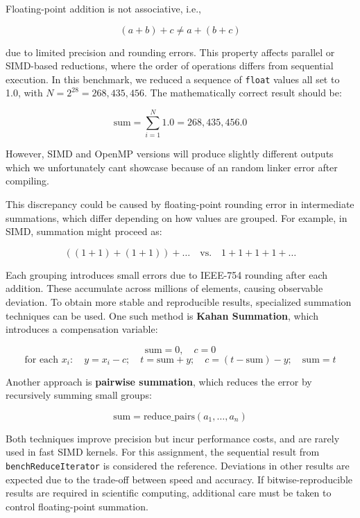 Floating-point addition is not associative, i.e.,

\[
    (a + b) + c \neq a + (b + c)
\]

due to limited precision and rounding errors.
This property affects parallel or SIMD-based reductions, where the order of operations differs from sequential execution.
In this benchmark, we reduced a sequence of \texttt{float} values all set to 1.0, with \( N = 2^{28} = 268{,}435{,}456 \).
The mathematically correct result should be:

\[
    \text{sum} = \sum_{i=1}^{N} 1.0 = 268{,}435{,}456.0
\]

However, SIMD and OpenMP versions will produce slightly different outputs which we unfortunately cant showcase because of an random linker error after compiling.

This discrepancy could be caused by floating-point rounding error in intermediate summations, which differ depending on how values are grouped.
For example, in SIMD, summation might proceed as:

\[
    ((1 + 1) + (1 + 1)) + \ldots
    \quad \text{vs.} \quad
    1 + 1 + 1 + 1 + \ldots
\]

Each grouping introduces small errors due to IEEE-754 rounding after each addition.
These accumulate across millions of elements, causing observable deviation.
To obtain more stable and reproducible results, specialized summation techniques can be used.
One such method is \textbf{Kahan Summation}, which introduces a compensation variable:

\[
    \text{sum} = 0,\quad c = 0
\]
\[
    \text{for each } x_i: \quad y = x_i - c;\quad t = \text{sum} + y;\quad c = (t - \text{sum}) - y;\quad \text{sum} = t
\]

Another approach is \textbf{pairwise summation}, which reduces the error by recursively summing small groups:

\[
    \text{sum} = \text{reduce\_pairs}(a_1, \ldots, a_n)
\]

Both techniques improve precision but incur performance costs, and are rarely used in fast SIMD kernels.
For this assignment, the sequential result from \texttt{benchReduceIterator} is considered the reference.
Deviations in other results are expected due to the trade-off between speed and accuracy.
If bitwise-reproducible results are required in scientific computing, additional care must be taken to control floating-point summation.



